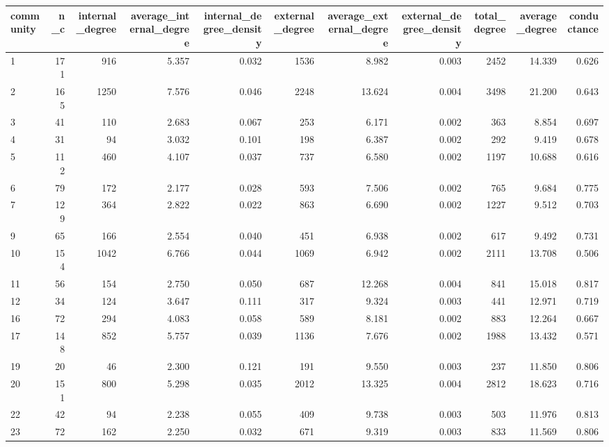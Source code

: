 \begin{table}[ht]
\centering
\begin{adjustbox}{max width=\textwidth}
\begin{tabular}{lrrrrrrrrrr}
  \hline
community & n\_c & internal\_degree & average\_internal\_degree & internal\_degree\_density & external\_degree & average\_external\_degree & external\_degree\_density & total\_degree & average\_degree & conductance \\ 
  \hline
1 & 171 & 916 & 5.357 & 0.032 & 1536 & 8.982 & 0.003 & 2452 & 14.339 & 0.626 \\ 
  2 & 165 & 1250 & 7.576 & 0.046 & 2248 & 13.624 & 0.004 & 3498 & 21.200 & 0.643 \\ 
  3 & 41 & 110 & 2.683 & 0.067 & 253 & 6.171 & 0.002 & 363 & 8.854 & 0.697 \\ 
  4 & 31 & 94 & 3.032 & 0.101 & 198 & 6.387 & 0.002 & 292 & 9.419 & 0.678 \\ 
  5 & 112 & 460 & 4.107 & 0.037 & 737 & 6.580 & 0.002 & 1197 & 10.688 & 0.616 \\ 
  6 & 79 & 172 & 2.177 & 0.028 & 593 & 7.506 & 0.002 & 765 & 9.684 & 0.775 \\ 
  7 & 129 & 364 & 2.822 & 0.022 & 863 & 6.690 & 0.002 & 1227 & 9.512 & 0.703 \\ 
  9 & 65 & 166 & 2.554 & 0.040 & 451 & 6.938 & 0.002 & 617 & 9.492 & 0.731 \\ 
  10 & 154 & 1042 & 6.766 & 0.044 & 1069 & 6.942 & 0.002 & 2111 & 13.708 & 0.506 \\ 
  11 & 56 & 154 & 2.750 & 0.050 & 687 & 12.268 & 0.004 & 841 & 15.018 & 0.817 \\ 
  12 & 34 & 124 & 3.647 & 0.111 & 317 & 9.324 & 0.003 & 441 & 12.971 & 0.719 \\ 
  16 & 72 & 294 & 4.083 & 0.058 & 589 & 8.181 & 0.002 & 883 & 12.264 & 0.667 \\ 
  17 & 148 & 852 & 5.757 & 0.039 & 1136 & 7.676 & 0.002 & 1988 & 13.432 & 0.571 \\ 
  19 & 20 & 46 & 2.300 & 0.121 & 191 & 9.550 & 0.003 & 237 & 11.850 & 0.806 \\ 
  20 & 151 & 800 & 5.298 & 0.035 & 2012 & 13.325 & 0.004 & 2812 & 18.623 & 0.716 \\ 
  22 & 42 & 94 & 2.238 & 0.055 & 409 & 9.738 & 0.003 & 503 & 11.976 & 0.813 \\ 
  23 & 72 & 162 & 2.250 & 0.032 & 671 & 9.319 & 0.003 & 833 & 11.569 & 0.806 \\ 

\end{tabular}
\end{adjustbox}
\end{table}
